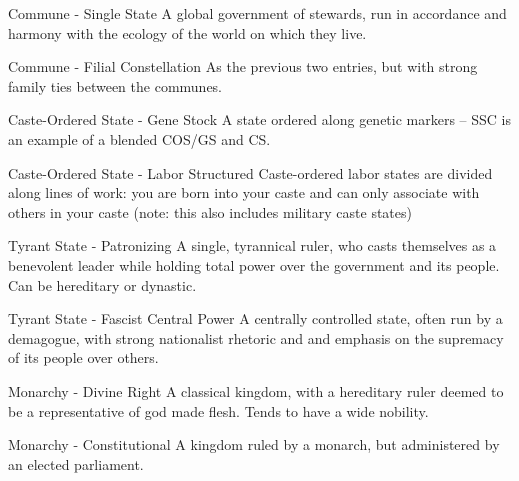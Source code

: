  Commune - Single State                                A global government of stewards, run in
                                                       accordance and harmony with the ecology of
                                                       the world on which they live.

 Commune - Filial Constellation                        As the previous two entries, but with strong
                                                       family ties between the communes.

 Caste-Ordered State - Gene Stock                      A state ordered along genetic markers -- SSC
                                                       is an example of a blended COS/GS and CS.

 Caste-Ordered State - Labor Structured                Caste-ordered labor states are divided along
                                                       lines of work: you are born into your caste
                                                       and can only associate with others in your
                                                       caste (note: this also includes military caste
                                                       states)

 Tyrant State - Patronizing                            A single, tyrannical ruler, who casts
                                                       themselves as a benevolent leader while
                                                       holding total power over the government and
                                                       its people. Can be hereditary or dynastic.

 Tyrant State - Fascist Central Power                  A centrally controlled state, often run by a
                                                       demagogue, with strong nationalist rhetoric
                                                       and and emphasis on the supremacy of its
                                                       people over others.

 Monarchy - Divine Right                               A classical kingdom, with a hereditary ruler
                                                       deemed to be a representative of god made
                                                       flesh. Tends to have a wide nobility.

 Monarchy - Constitutional                             A kingdom ruled by a monarch, but
                                                       administered by an elected parliament.

